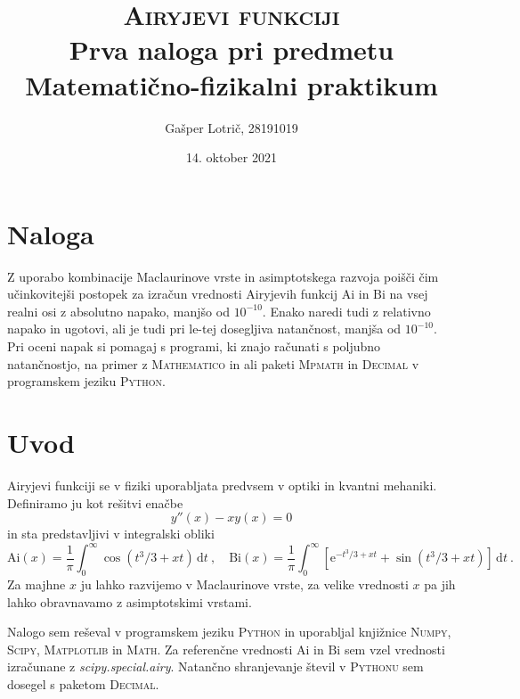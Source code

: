 \documentclass[a4paper, 12pt, slovene]{article}
\newcommand{\Ai}{\mathrm{Ai}}
\newcommand{\Bi}{\mathrm{Bi}}
\newcommand{\dd}{\,\mathrm{d}}
\begin{document}
\begin{titlepage}
\title{\textsc{Airyjevi funkciji} \\[1ex] \large Prva naloga pri predmetu Matematično-fizikalni praktikum}
\author{Gašper Lotrič, 28191019}
\date{14. oktober 2021}

\maketitle
\end{titlepage}

\tableofcontents
\pagebreak


\section{Naloga}
Z uporabo kombinacije Maclaurinove vrste in asimptotskega razvoja poišči čim učinkovitejši postopek za izračun vrednosti Airyjevih funkcij $\Ai$ in $\Bi$ na vsej realni osi z absolutno napako, manjšo od $10^{-10}$. Enako naredi tudi z relativno napako in ugotovi, ali je tudi pri le-tej dosegljiva natančnost, manjša od $10^{-10}$. Pri oceni napak si pomagaj s programi, ki znajo računati s poljubno natančnostjo, na primer z \textsc{Mathematico} in ali paketi \textsc{Mpmath} in \textsc{Decimal} v programskem jeziku \textsc{Python}.

\section{Uvod}
Airyjevi funkciji se v fiziki uporabljata predvsem v optiki in kvantni mehaniki. Definiramo ju kot rešitvi enačbe
\begin{equation}
y''(x)-xy(x) = 0
\end{equation}
in sta predstavljivi v integralski obliki
\begin{equation*}
  \Ai(x) = \frac{1}{\pi} \int_0^\infty \cos (t^3/3 + x t) \dd t \>,\quad
  \Bi(x) = \frac{1}{\pi} \int_0^\infty \left[ \mathrm{e}^{-t^3/3 + x t}
  + \sin (t^3/3 + x t) \right] \dd t \>.
\end{equation*}
Za majhne $x$ ju lahko razvijemo v Maclaurinove vrste, za velike vrednosti $x$ pa jih lahko obravnavamo z asimptotskimi vrstami. \par\vspace{5mm}

Nalogo sem reševal v programskem jeziku \textsc{Python} in uporabljal knjižnice \textsc{Numpy, Scipy, Matplotlib} in \textsc{Math}. Za referenčne vrednosti $\Ai$ in $\Bi$ sem vzel vrednosti izračunane z \textsl{scipy.special.airy}. Natančno shranjevanje števil v \textsc{Pythonu} sem dosegel s paketom \textsc{Decimal}.
\end{document}
